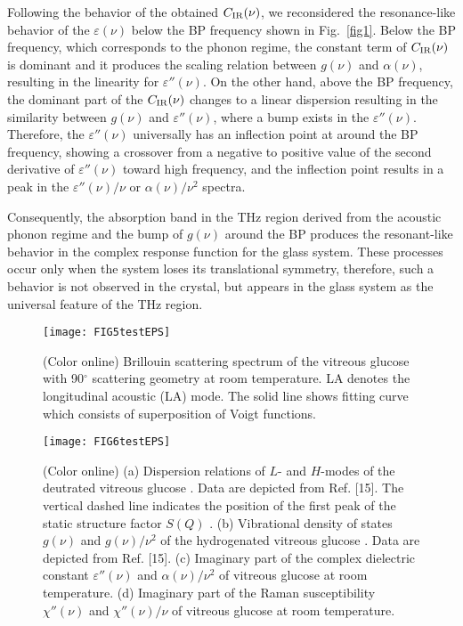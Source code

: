 \documentclass[%
 reprint,
superscriptaddress,
 amsmath,amssymb,
 aps,
prb,
]{revtex4-1}
\begin{document}
Following the behavior of the obtained $C_{\rm IR}(\nu)$, we reconsidered the resonance-like behavior of the $\varepsilon(\nu)$ below the BP frequency shown in Fig.~\ref{fig1}.
Below the BP frequency, which corresponds to the phonon regime\cite{Nakayama2002}, the constant term of $C_{\rm IR}(\nu)$ is dominant and it produces the scaling relation between $g(\nu)$ and $\alpha(\nu)$, resulting in the linearity for $\varepsilon''(\nu)$.
On the other hand, above the BP frequency, the dominant part of the $C_{\rm IR}(\nu)$ changes to a linear dispersion resulting in the similarity between $g(\nu)$ and $\varepsilon''(\nu)$, where a bump exists in the $\varepsilon''(\nu)$.
Therefore, the $\varepsilon''(\nu)$ universally has an inflection point at around the BP frequency, showing a crossover from a negative to positive value of the second derivative of $\varepsilon''(\nu)$ toward high frequency, and the inflection point results in a peak in the  $\varepsilon''(\nu)/\nu$ or  $\alpha(\nu)/\nu^{2}$ spectra.

Consequently, the absorption band in the THz region derived from the acoustic phonon regime and the bump of $g(\nu)$ around the BP produces the resonant-like behavior in the complex response function for the glass system.
These processes occur only when the system loses its translational symmetry, therefore, such a behavior is not observed in the crystal, but appears in the glass system as the universal feature of the THz region.

\begin{figure}[t]
\texttt{[image: FIG5testEPS]}
\caption{(Color online) Brillouin scattering spectrum of the vitreous glucose with 90$^\circ$ scattering geometry at room temperature. LA denotes the longitudinal acoustic (LA) mode. The solid line shows fitting curve which consists of superposition of Voigt functions.}
\label{fig5}
\end{figure}

\begin{figure*}
\texttt{[image: FIG6testEPS]}
\caption{(Color online) (a) Dispersion relations of $L$- and $H$-modes of the deutrated vitreous glucose \cite{Violini2012}. Data are depicted from Ref. [15]. The vertical dashed line indicates the position of the first peak of the static structure factor $S(Q)$ \cite{Violini2012}. (b) Vibrational density of states $g(\nu)$ and $g(\nu)/\nu^{2}$ of the hydrogenated vitreous glucose \cite{Violini2012}. Data are depicted from Ref. [15]. (c) Imaginary part of the complex dielectric constant $\varepsilon''(\nu)$ and $\alpha(\nu)/\nu^{2}$ of vitreous glucose at room temperature. (d) Imaginary part of the Raman susceptibility $\chi''(\nu)$ and $\chi''(\nu)/\nu$ of vitreous glucose at room temperature.}
\label{fig6}
\end{figure*}
\end{document}
